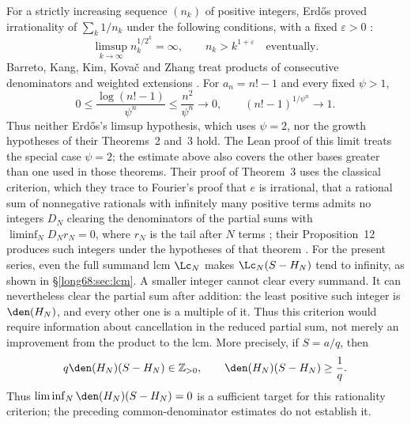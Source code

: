 For a strictly increasing sequence $(n_k)$ of positive integers,
Erd\H{o}s proved irrationality of $\sum_k1/n_k$ under the following
conditions, with a fixed $\varepsilon>0$ \cite[Theorem~1, p.~1]{erdos1975}:
\[
 \limsup_{k\to\infty}n_k^{1/2^k}=\infty,
 \qquad n_k>k^{1+\varepsilon}\quad\text{eventually}.
\]
Barreto, Kang, Kim, Kova\v{c}
and Zhang treat products of consecutive denominators and weighted extensions
\cite[Thms.~2--3 and Rem.~4, pp.~2--5]{barreto-et-al}.  For $a_n=n!-1$ and every fixed $\psi>1$,
\[
 0\le\frac{\log(n!-1)}{\psi^n}\le\frac{n^2}{\psi^n}\longrightarrow0,
 \qquad (n!-1)^{1/\psi^n}\longrightarrow1.
\]
Thus neither Erd\H{o}s's limsup hypothesis, which uses $\psi=2$, nor the
growth hypotheses of their Theorems~2 and~3 hold. The Lean proof of this
limit treats the special case $\psi=2$; the estimate above also covers the other
bases greater than one used in those theorems.  Their proof of Theorem~3 uses the classical
criterion, which they trace to Fourier's proof that $e$ is irrational, that a
rational sum of nonnegative rationals with infinitely many positive terms
admits no integers $D_N$ clearing the denominators of the partial sums
with $\liminf_ND_Nr_N=0$, where $r_N$
is the tail after $N$ terms \cite[Lem.~8, p.~6]{barreto-et-al}; their
Proposition~12 produces such integers under the hypotheses of that theorem
\cite[pp.~9--12]{barreto-et-al}.
For the present series, even the full summand lcm $\Lc_N$ makes
$\Lc_N(S-H_N)$ tend to infinity, as shown in \S\ref{long68:sec:lcm}.
A smaller integer cannot clear every summand. It can nevertheless clear
the partial sum after addition: the least positive such integer is
$\den(H_N)$, and every other one is a multiple of it. Thus this criterion
would require information about cancellation in the reduced partial sum,
not merely an improvement from the product to the lcm. More precisely, if
$S=a/q$, then
\[
 q\den(H_N)(S-H_N)\in\mathbb Z_{>0},
 \qquad \den(H_N)(S-H_N)\ge\frac1q.
\]
Thus $\liminf_N\den(H_N)(S-H_N)=0$ is a sufficient target for this
rationality criterion; the preceding common-denominator estimates
do not establish it.

